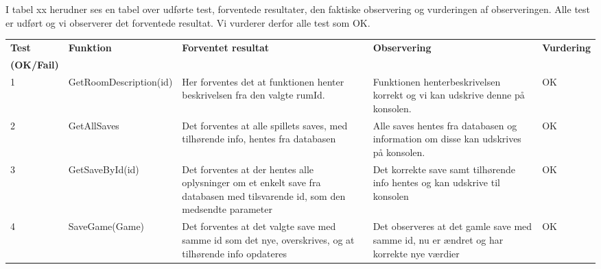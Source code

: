 I tabel xx herudner ses en tabel over udførte test, forventede resultater, den faktiske observering og vurderingen af observeringen.
Alle test er udført og vi observerer det forventede resultat. Vi vurderer derfor alle test som OK.

\begin{table}[H]
\begin{tabular}{|p{0.75cm}|p{3.75cm}|p{3.5cm}|p{3.5cm}|p{1.75cm}|} \hline
 \textbf{Test} & \textbf{Funktion} & \textbf{Forventet resultat} & \textbf{Observering} & \textbf{Vurdering} \\ \textbf{(OK/Fail)}\\\hline
 1 & GetRoomDescription(id) & Her forventes det at funktionen henter beskrivelsen fra den valgte rumId. & Funktionen henterbeskrivelsen korrekt og vi kan udskrive denne på konsolen. & OK \\ \hline
 2 & GetAllSaves & Det forventes at alle spillets saves, med tilhørende info, hentes fra databasen & Alle saves hentes fra databasen og information om disse kan udskrives på konsolen. & OK \\ \hline
 3 & GetSaveById(id) & Det forventes at der hentes alle oplysninger om et enkelt save fra databasen med tilsvarende id, som den medsendte parameter & Det korrekte save samt tilhørende info hentes og kan udskrive til konsolen & OK \\ \hline
 4 & SaveGame(Game) & Det forventes at det valgte save med samme id som det nye, overskrives, og at tilhørende info opdateres & Det observeres at det gamle save med samme id, nu er ændret og har korrekte nye værdier & OK \\ \hline
\end{tabular}
\end{table}

